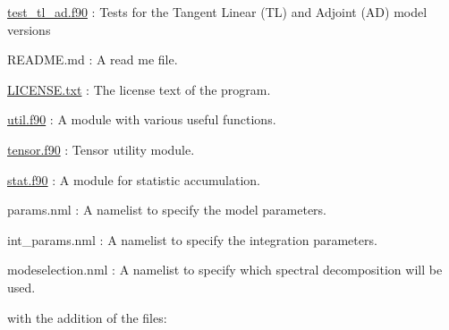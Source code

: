 \begin{DoxyItemize}
\item \hyperlink{test__tl__ad_8f90}{test\+\_\+tl\+\_\+ad.\+f90} \+: Tests for the Tangent Linear (TL) and Adjoint (AD) model versions
\item R\+E\+A\+D\+M\+E.\+md \+: A read me file.
\item \hyperlink{LICENSE_8txt}{L\+I\+C\+E\+N\+S\+E.\+txt} \+: The license text of the program.
\item \hyperlink{util_8f90}{util.\+f90} \+: A module with various useful functions.
\item \hyperlink{tensor_8f90}{tensor.\+f90} \+: Tensor utility module.
\item \hyperlink{stat_8f90}{stat.\+f90} \+: A module for statistic accumulation.
\item params.\+nml \+: A namelist to specify the model parameters.
\item int\+\_\+params.\+nml \+: A namelist to specify the integration parameters.
\item modeselection.\+nml \+: A namelist to specify which spectral decomposition will be used.
\end{DoxyItemize}

with the addition of the files\+:


